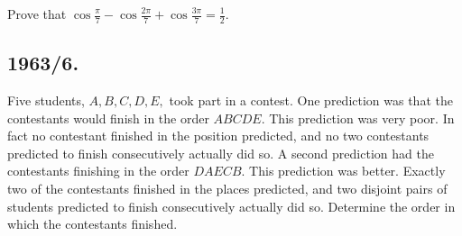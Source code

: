 \documentclass[12pt,thmsa]{article}
\begin{document}
Prove that $\cos \frac{\pi }{7}-\cos \frac{2\pi }{7}+\cos \frac{3\pi }{7}=%
\frac{1}{2}.$

\subsection{1963/6.}

Five students, $A,B,C,D,E,$ took part in a contest. One prediction was that
the contestants would finish in the order $ABCDE.$ This prediction was very
poor. In fact no contestant finished in the position predicted, and no two
contestants predicted to finish consecutively actually did so. A second
prediction had the contestants finishing in the order $DAECB.$ This
prediction was better. Exactly two of the contestants finished in the places
predicted, and two disjoint pairs of students predicted to finish
consecutively actually did so. Determine the order in which the contestants
finished.
\end{document}
